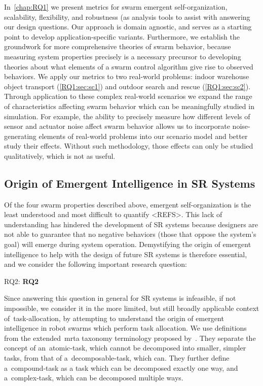 \noindent
In~\cref{chap:RQ1} we present metrics for swarm emergent self-organization,
scalability, flexibility, and robustness (as analysis tools to assist with
answering our design questions. Our approach is domain agnostic, and serves as a
starting point to develop application-specific variants. Furthermore, we
establish the groundwork for more comprehensive theories of swarm behavior,
because measuring system properties precisely is a necessary precursor to
developing theories about what elements of a swarm control algorithm give rise
to observed behaviors. We apply our metrics to two real-world problems: indoor
warehouse object transport (\cref{RQ1:sec:sc1}) and outdoor search and rescue
(\cref{RQ1:sec:sc2}).  Through application to these complex real-world scenarios
we expand the range of characteristics affecting swarm behavior which can be
meaningfully studied in simulation. For example, the ability to precisely
measure how different levels of sensor and actuator noise affect swarm behavior
allows us to incorporate noise-generating elements of real-world problems into
our scenario model and better study their effects. Without such methodology,
those effects can only be studied qualitatively, which is not as useful.

\subsection{Origin of Emergent Intelligence in SR Systems}
%
Of the four swarm properties described above, emergent self-organization is the
least understood and most difficult to quantify <REFS>. This lack of
understanding has hindered the development of SR systems because
designers are not able to guarantee that no negative behaviors (those that
oppose the system's goal) will emerge during system operation. Demystifying the
origin of emergent intelligence to help with the design of future SR
systems is therefore essential, and we consider the following important research
question:

\medskip\noindent
\gls{RQ2}: \textbf{\Glsdesc{RQ2}}
\medskip

\noindent
Since answering this question in general for SR systems is infeasible, if
not impossible, we consider it in the more limited, but still broadly applicable
context of~\gls{task-allocation}, by attempting to understand the origin of
emergent intelligence in robot swarms which perform task allocation. We use
definitions from the extended~\gls{mrta} taxonomy terminology proposed
by~\cite{Korsah2013}.  They separate the concept of an~\gls{atomic-task}, which
cannot be decomposed into smaller, simpler tasks, from that of
a~\gls{decomposable-task}, which can. They further define a~\gls{compound-task}
as a task which can be decomposed exactly one way, and a~\gls{complex-task},
which can be decomposed multiple ways.

